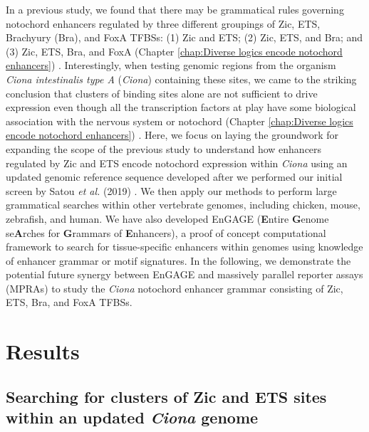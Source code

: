 In a previous study, we found that there may be grammatical rules governing notochord enhancers regulated by three different groupings of Zic, ETS, Brachyury (Bra), and FoxA TFBSs: (1) Zic and ETS; (2) Zic, ETS, and Bra; and (3) Zic, ETS, Bra, and FoxA (Chapter \ref{chap:Diverse logics encode notochord enhancers}) \cite{song2022}. Interestingly, when testing genomic regions from the organism \textit{Ciona intestinalis type A} (\textit{Ciona}) containing these sites, we came to the striking conclusion that clusters of binding sites alone are not sufficient to drive expression even though all the transcription factors at play have some biological association with the nervous system or notochord (Chapter \ref{chap:Diverse logics encode notochord enhancers}) \cite{song2022}. Here, we focus on laying the groundwork for expanding the scope of the previous study to understand how enhancers regulated by Zic and ETS encode notochord expression within \textit{Ciona} using an updated genomic reference sequence developed after we performed our initial screen by Satou \textit{et al.} (2019) \cite{satou2019}. We then apply our methods to perform large grammatical searches within other vertebrate genomes, including chicken, mouse, zebrafish, and human. We have also developed EnGAGE (\textbf{E}ntire \textbf{G}enome se\textbf{A}rches for \textbf{G}rammars of \textbf{E}nhancers), a proof of concept computational framework to search for tissue-specific enhancers within genomes using knowledge of enhancer grammar or motif signatures. In the following, we demonstrate the potential future synergy between EnGAGE and massively parallel reporter assays (MPRAs) to study the \textit{Ciona} notochord enhancer grammar consisting of Zic, ETS, Bra, and FoxA TFBSs. 

\section{Results}

\subsection{Searching for clusters of Zic and ETS sites within an updated \textit{Ciona} genome}

